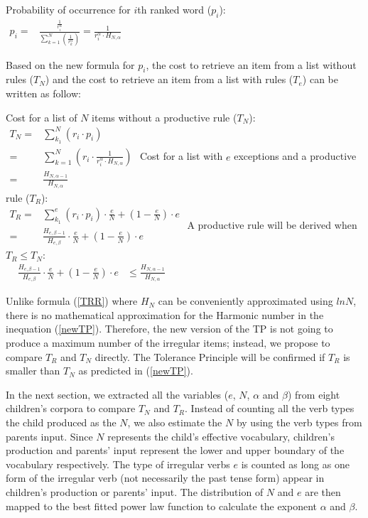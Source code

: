 \begin{exe} 
\ex \label{newp}Probability of occurrence for $i$th ranked word ($p_i$):\\
$\begin{aligned}
p_i = & \frac{\frac{1}{r_i^\alpha}}{\displaystyle\sum_{k=1}^N (\frac{1}{r_k^\alpha})} = \frac{1}{r_i^\alpha\cdot H_{N,\alpha}}
\end{aligned}$ 
\end{exe}
Based on the new formula for $p_i$, the cost to retrieve an item from a list without rules ($T_N$) and the cost to retrieve an item from a list with rules ($T_e$) can be written as follow:
\begin{exe}
\ex \label{newTN}Cost for a list of $N$ items without a productive rule ($T_N$):\\
$\begin{aligned}
T_N = &{\displaystyle\sum_{k_1}^N(r_i\cdot p_i)}\\
= & {\displaystyle\sum_{k=1}^N(r_i\cdot\frac{1}{r_i^\alpha\cdot H_{N,\alpha}})} \\
= & \frac{H_{N,\alpha-1}}{H_{N,\alpha}}
\end{aligned}$
\ex \label{newTR}Cost for a list with $e$ exceptions and a productive rule ($T_R$):\\
$\begin{aligned}
T_R = &{\displaystyle\sum_{k_1}^e (r_i\cdot p_i)} \cdot \frac{e}{N} + (1-\frac{e}{N}) \cdot e\\
= & \frac{H_{e,\beta-1}}{H_{e,\beta}}\cdot\frac{e}{N} + (1-\frac{e}{N})\cdot e
\end{aligned}$
\ex \label{newTP}A productive rule will be derived when $T_R \leq T_N$:\\
$\begin{aligned}
& \frac{H_{e,\beta-1}}{H_{e,\beta}}\cdot\frac{e}{N} + (1-\frac{e}{N})\cdot e & \leq  \frac{H_{N,\alpha-1}}{H_{N,\alpha}}
\end{aligned}$
\end{exe}

Unlike formula (\ref{TRR}) where $H_N$ can be conveniently approximated using $lnN$, there is no mathematical approximation for the Harmonic number in the inequation (\ref{newTP}). Therefore, the new version of the TP is not going to produce a maximum number of the irregular items; instead, we propose to compare $T_R$ and $T_N$ directly. The Tolerance Principle will be confirmed if $T_R$ is smaller than $T_N$ as predicted in (\ref{newTP}). 

In the next section, we extracted all the variables ($e$, $N$, $\alpha$ and $\beta$) from eight children's corpora to compare $T_N$ and $T_R$. Instead of counting all the verb types the child produced as the $N$, we also estimate the $N$ by using the verb types from parents input. Since $N$ represents the child's effective vocabulary, children's production and parents' input represent the lower and upper boundary of the vocabulary respectively. The type of irregular verbs $e$ is counted as long as one form of the irregular verb (not necessarily the past tense form) appear in children's production or parents' input. The distribution of $N$ and $e$ are then mapped to the best fitted power law function to calculate the exponent $\alpha$ and $\beta$. 